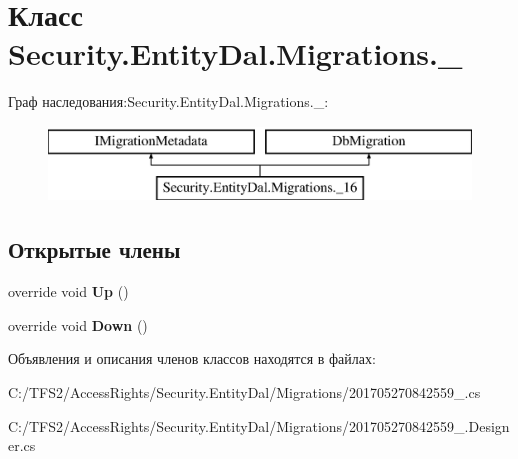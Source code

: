 \hypertarget{class_security_1_1_entity_dal_1_1_migrations_1_1__16}{}\section{Класс Security.\+Entity\+Dal.\+Migrations.\+\_}
\label{class_security_1_1_entity_dal_1_1_migrations_1_1__16}
Граф наследования\+:Security.\+Entity\+Dal.\+Migrations.\+\_\+:\begin{figure}[H]
\begin{center}
\leavevmode
\includegraphics[height=2.000000cm]{d9/d2d/class_security_1_1_entity_dal_1_1_migrations_1_1__16}
\end{center}
\end{figure}
\subsection*{Открытые члены}
\begin{DoxyCompactItemize}
\item 
\mbox{\label{class_security_1_1_entity_dal_1_1_migrations_1_1__16_acb45d6d2478c3632264b76670b2745b4}} 
override void {\bfseries Up} ()
\item 
\mbox{\label{class_security_1_1_entity_dal_1_1_migrations_1_1__16_a7e8d9279a51b6b8391428b8e2324a5a0}} 
override void {\bfseries Down} ()
\end{DoxyCompactItemize}


Объявления и описания членов классов находятся в файлах\+:\begin{DoxyCompactItemize}
\item 
C\+:/\+T\+F\+S2/\+Access\+Rights/\+Security.\+Entity\+Dal/\+Migrations/201705270842559\+\_.\+cs\item 
C\+:/\+T\+F\+S2/\+Access\+Rights/\+Security.\+Entity\+Dal/\+Migrations/201705270842559\+\_.\+Designer.\+cs\end{DoxyCompactItemize}
